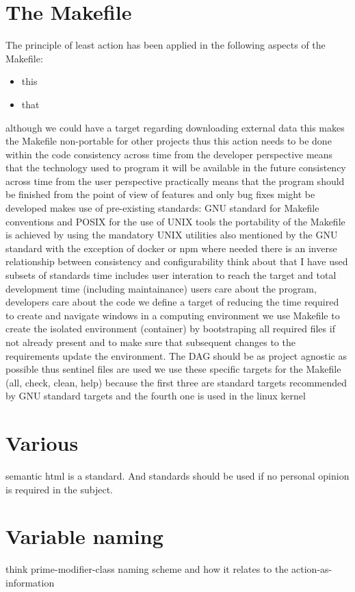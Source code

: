 \documentclass[journal]{IEEEtran}
\begin{document}
\section{The Makefile}
The principle of least action has been applied in the following aspects of the Makefile:
\begin{itemize}
	\item this
	\item that
\end{itemize}

although we could have a target regarding downloading external data this makes the Makefile non-portable for other projects thus this action needs to be done within the code
consistency across time from the developer perspective means that the technology used to program it will be available in the future
consistency across time from the user perspective practically means that the program should be finished from the point of view of features and only bug fixes might be developed
makes use of pre-existing standards: GNU standard for Makefile conventions and POSIX for the use of UNIX tools
the portability of the Makefile is achieved by using the mandatory UNIX utilities also mentioned by the GNU standard with the exception of docker or npm where needed
there is an inverse relationship between consistency and configurability
think about that I have used subsets of standards
time includes user interation to reach the target and total development time (including maintainance)
users care about the program, developers care about the code
we define a target of reducing the time required to create and navigate windows in a computing environment
we use Makefile to create the isolated environment (container) by bootstraping all required files if not already present and to make sure that subsequent changes to the requirements update the environment. The DAG should be as project agnostic as possible thus sentinel files are used
we use these specific targets for the Makefile (all, check, clean, help) because the first three are standard targets recommended by GNU standard targets and the fourth one is used in the linux kernel

\section{Various}
semantic html is a standard. And standards should be used if no personal opinion is required in the subject.

\section{Variable naming}
think prime-modifier-class naming scheme and how it relates to the action-as-information
\end{document}
